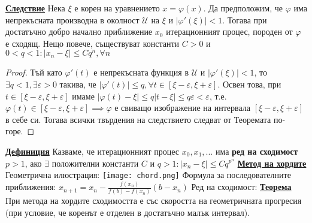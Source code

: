 \documentclass{article}
\begin{document}
\textbf{\underline{Следствие}}
Нека $\xi$ е корен на уравнението $x = \varphi(x)$. Да предположим, че $\varphi$ има непрекъсната производна в околност
$\mathcal{U}$ на $\xi$ и $|\varphi'(\xi)| < 1$. Тогава при достатъчно добро начално приближение $x_0$ итерационният процес,
породен от $\varphi$ е сходящ. Нещо повече, съществуват константи $C > 0$ и $0 < q < 1 : |x_n - \xi| \le Cq^n, \forall n$
\begin{proof}
Тъй като $\varphi'(t)$ е непрекъсната функция в $\mathcal{U}$ и $|\varphi'(\xi)| < 1$, то $\exists q < 1, \exists \varepsilon > 0$
такива, че $|\varphi'(t)| \le q, \forall t \in [\xi - \varepsilon, \xi + \varepsilon]$. Освен това, при $t \in [\xi - \varepsilon,
\xi + \varepsilon]$ имаме $|\varphi(t) - \xi| \le q |t - \xi| \le q\varepsilon < \varepsilon$, т.е. $\varphi(t) \in [\xi -
\varepsilon, \xi + \varepsilon] \implies \varphi$ е свиващо изображение на интервала $[\xi - \varepsilon, \xi + \varepsilon]$ в
себе си. Тогава всички твърдения на следствието следват от Теоремата по-горе.
\end{proof}
\textbf{\underline{Дефиниция}}
Казваме, че итерационният процес $x_0, x_1, ...$ има \textbf{ред на сходимост} $p > 1$, ако $\exists$ положителни константи $C$
и $q > 1 : |x_n - \xi| \le Cq^{p^n}$ \newline\newline
\textbf{\underline{Метод на хордите}} \newline
Геометрична илюстрация: \texttt{[image: chord.png]} \newline
Формула за последователните приближения: $x_{n+1} = x_n - \frac{f(x_n)}{f(b) - f(x_n)}(b - x_n)$ \newline
Ред на сходимост: \newline\newline
\textbf{\underline{Теорема}} \newline
При метода на хордите сходимостта е със скоростта на геометричната прогресия (при условие, че коренът е отделен в достатъчно малък интервал).
\end{document}
